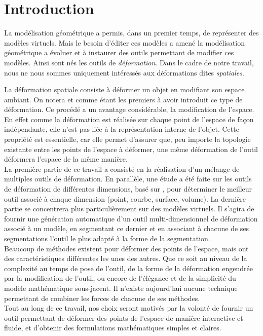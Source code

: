 \chapter{Introduction}

\graphicspath{ {Introduction/IntroductionFigs/PNG/}
  {Introduction/IntroductionFigs/PDF/}
  {Introduction/IntroductionFigs/} }

La modélisation géométrique a permis, dans un premier temps, de
représenter des modèles virtuels.  Mais le besoin d'éditer ces modèles
a amené la modélisation géométrique a évoluer et à instaurer des
outils permettant de modifier ces modèles.  Ainsi sont nés les outils
de \textit{déformation}. Dans le cadre de notre travail, nous ne nous
sommes uniquement intéressés aux déformations dites
\textit{spatiales}.

La déformation spatiale consiste à déformer un objet en modifiant son
espace ambiant.  On notera \cite{Bar84} et \cite{SP86} comme étant les
premiers à avoir introduit ce type de déformation. Ce procédé a un
avantage considérable, la modification de l'espace. En effet comme la
déformation est réalisée sur chaque point de l'espace de façon
indépendante, elle n'est pas liée à la représentation interne de
l'objet. Cette propriété est essentielle, car elle permet d'assurer
que, peu importe la topologie existante entre les points de l'espace à
déformer, une même déformation de l'outil déformera l'espace de la
même manière.
\\

La première partie de ce travail a consisté en la réalisation d'un
mélange de multiples outils de déformation. En parallèle, une étude a
été faite sur les outils de déformation de différentes dimensions,
basé sur \cite{GB08}, pour déterminer le meilleur outil associé à
chaque dimension (point, courbe, surface, volume).  La dernière partie
se concentrera plus particulièrement sur des modèles virtuels. Il
s'agira de fournir une génération automatique d'un outil
multi-dimensionnel de déformation associé à un modèle, en segmentant
ce dernier et en associant à chacune de ses segmentations l'outil le
plus adapté à la forme de la segmentation.
\\

Beaucoup de méthodes existent pour déformer des points de l'espace,
mais ont des caractéristiques différentes les unes des autres. Que ce
soit au niveau de la complexité au temps de pose de l'outil, de la
forme de la déformation engendrée par la modification de l'outil, ou
encore de l'élégance et de la simplicité du modèle mathématique
sous-jacent. Il n'existe aujourd'hui aucune technique permettant de
combiner les forces de chacune de ses méthodes.
\\

Tout au long de ce travail, nos choix seront motivés par la volonté de
fournir un outil permettant de déformer des points de l'espace de
manière interactive et fluide, et d'obtenir des formulations
mathématiques simples et claires.


